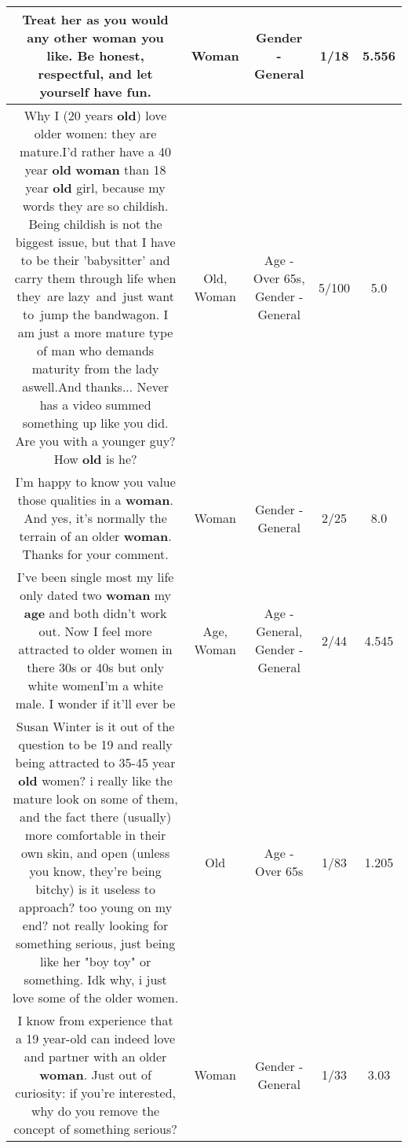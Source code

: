 \documentclass[11pt]{article}
\newlength\mylength
\begin{document}
\begin{center}
\begin{longtable}{|C{.65\mylength}|C{.30\mylength}|C{.12\mylength}|C{.12\mylength}|C{.12\mylength}|}
  \small Treat her as you would any other \textbf{woman} you like. Be honest, respectful, and let yourself have fun.\normalsize   & Woman & Gender - General & 1/18 & 5.556 \\  \hline
  \small Why I (20 years \textbf{old}) love older women: they are mature.I'd rather have a 40 year \textbf{old} \textbf{woman} than 18 year \textbf{old} girl, because my words they are so childish. Being childish is not the biggest issue, but that I have to be their 'babysitter' and carry them through life when they are lazy and just want to jump the bandwagon. I am just a more mature type of man who demands maturity from the lady aswell.And thanks... Never has a video summed something up like you did. Are you with a younger guy? How \textbf{old} is he?\normalsize   & Old, Woman & Age - Over 65s, Gender - General & 5/100 & 5.0 \\  \hline
  \small I'm happy to know you value those qualities in a \textbf{woman}. And yes, it's normally the terrain of an older \textbf{woman}. Thanks for your comment.\normalsize   & Woman & Gender - General & 2/25 & 8.0 \\  \hline
  \small I've been single most my life only dated two \textbf{woman} my \textbf{age} and both didn't work out. Now I feel more attracted to older women in there 30s or 40s but only white womenI'm a white male. I wonder if it'll ever be\normalsize   & Age, Woman & Age - General, Gender - General & 2/44 & 4.545 \\  \hline
  \small Susan Winter is it out of the question to be 19 and really being attracted to 35-45 year \textbf{old} women? i really like the mature look on some of them, and the fact there (usually) more comfortable in their own skin, and open (unless you know, they're being bitchy) is it useless to approach? too young on my end? not really looking for something serious, just being like her "boy toy" or something. Idk why, i just love some  of the older women.\normalsize   & Old & Age - Over 65s & 1/83 & 1.205 \\  \hline
  \small I know from experience that a 19 year-old can indeed love and partner with an older \textbf{woman}. Just out of curiosity: if you're interested, why do you remove the concept of something serious?\normalsize   & Woman & Gender - General & 1/33 & 3.03 \\  \hline

\end{longtable}
\end{center}
\end{document}
